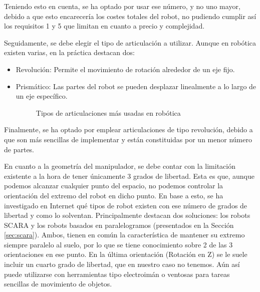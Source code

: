 Teniendo esto en cuenta, se ha optado por usar ese número, y no uno mayor, debido a que esto encarecería los costes totales del robot, no pudiendo cumplir así 
los requisitos 1 y 5 que limitan en cuanto a precio y complejidad. 

Seguidamente, se debe elegir el tipo de articulación a utilizar. Aunque en robótica existen varias, en la práctica destacan dos:
\begin{itemize}
\item Revolución: Permite el movimiento de rotación alrededor de un eje fijo.
\item Prismático: Las partes del robot se pueden desplazar linealmente a lo largo de un eje específico. 

\begin{figure} [h!]
  \centering    
  \hspace{1cm}
  \caption{Tipos de articulaciones más usadas en robótica}
\end{figure}

\end{itemize}

Finalmente, se ha optado por emplear articulaciones de tipo revolución, debido a que son más sencillas de implementar y 
están constituidas por un menor número de partes.

En cuanto a la geometría del manipulador, se debe contar con la limitación existente a la hora de tener únicamente 3 grados de libertad. Esta es 
que, aunque podemos alcanzar cualquier punto del espacio, no podemos controlar la orientación del extremo del robot en dicho punto. En base a esto, 
se ha investigado en Internet qué tipos de robot existen con ese número de grados de libertad y como lo solventan. Principalmente destacan dos 
soluciones: los robots SCARA y los robots basados en paralelogramos (presentados en la Sección \ref{sec:scara}). Ambos, tienen en común la 
característica de mantener su extremo siempre paralelo al suelo, por lo que se tiene conocimiento sobre 2 de las 3 orientaciones en ese punto. En 
la última orientación (Rotación en Z) se le suele incluir un cuarto grado de libertad, que en nuestro caso no tenemos. Aún así puede utilizarse con 
herramientas tipo electroimán o ventosas para tareas sencillas de movimiento de objetos.

